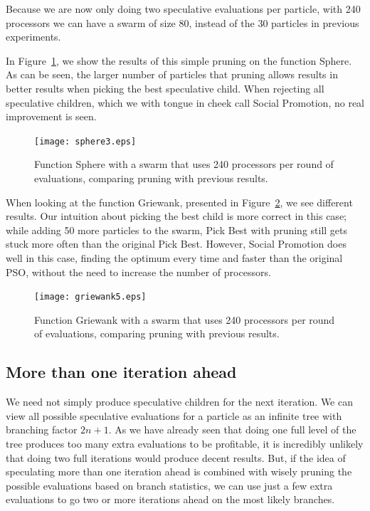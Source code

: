 \documentclass[journal,letterpaper]{IEEEtran}
\newcommand{\fig}[1]{Figure~\ref{fig:#1}}
\begin{document}
Because we are now only doing two speculative evaluations per particle, with
240 processors we can have a swarm of size 80, instead of the 30 particles in
previous experiments.  

In \fig{sphere-pruned}, we show the results of this simple pruning on the
function Sphere.  As can be seen, the larger number of particles that pruning
allows results in better results when picking the best speculative child.  
When rejecting all speculative children, which we with tongue in cheek call
Social Promotion, no real improvement is seen.

\begin{figure}
  \centering
  \texttt{[image: sphere3.eps]}
  \caption{Function Sphere with a swarm that uses 240 processors per round of
  evaluations, comparing pruning with previous results.}
  \label{fig:sphere-pruned}
\end{figure}

When looking at the function Griewank, presented in \fig{griewank-pruned}, we
see different results.  Our intuition about picking the best child is more
correct in this case; while adding 50 more particles to the swarm, Pick Best
with pruning still gets stuck more often than the original Pick Best.  However,
Social Promotion does well in this case, finding the optimum every time and
faster than the original PSO, without the need to increase the number of
processors.

\begin{figure}
  \centering
  \texttt{[image: griewank5.eps]}
  \caption{Function Griewank with a swarm that uses 240 processors per round of
  evaluations, comparing pruning with previous results.}
  \label{fig:griewank-pruned}
\end{figure}

\subsection{More than one iteration ahead}

We need not simply produce speculative children for the next iteration.  We can
view all possible speculative evaluations for a particle as an infinite tree
with branching factor $2n+1$.  As we have already seen that doing one full
level of the tree produces too many extra evaluations to be profitable, it is
incredibly unlikely that doing two full iterations would produce decent
results.  But, if the idea of speculating more than one iteration ahead is
combined with wisely pruning the possible evaluations based on branch
statistics, we can use just a few extra evaluations to go two or more
iterations ahead on the most likely branches.
\end{document}
